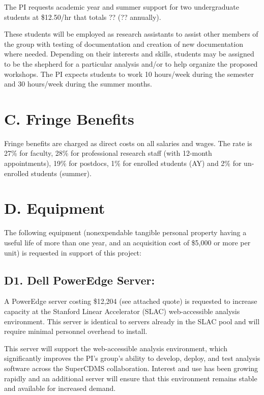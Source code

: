 \documentclass[11pt,oneside]{memoir}
\begin{document}
The PI requests academic year and summer support for two undergraduate students at \$12.50/hr that totals ?? (?? annually).

These students will be employed as research assistants to assist other members of the group with testing of documentation and creation of new documentation where needed.  Depending on their interests and skills, students may be assigned to be the shepherd for a particular analysis and/or to help organize the proposed workshops.  The PI expects students to work 10 hours/week during the semester and 30 hours/week during the summer months.


\section*{C. Fringe Benefits} 

Fringe benefits are charged as direct costs on all salaries and wages. The rate is 27\% for faculty, 28\% for professional research staff (with 12-month appointments), 19\% for postdocs, 1\% for enrolled students (AY) and 2\% for un-enrolled students (summer).

\section*{D. Equipment}
The following equipment (nonexpendable tangible personal property having a useful life of more than one year, and an acquisition cost of \$5,000 or more per unit) is requested in support of this project:

\subsection{D1. Dell PowerEdge Server:}  A PowerEdge server costing \$12,204 (see attached quote) is requested to increase capacity at the Stanford Linear Accelerator (SLAC) web-accessible analysis environment.  This server is identical to servers already in the SLAC pool and will require minimal personnel overhead to install.

This server will support the web-accessible analysis environment, which significantly improves the PI's group's ability to develop, deploy, and test analysis software across the SuperCDMS collaboration.  Interest and use has been growing rapidly and an additional server will ensure that this environment remains stable and available for increased demand.
\end{document}
